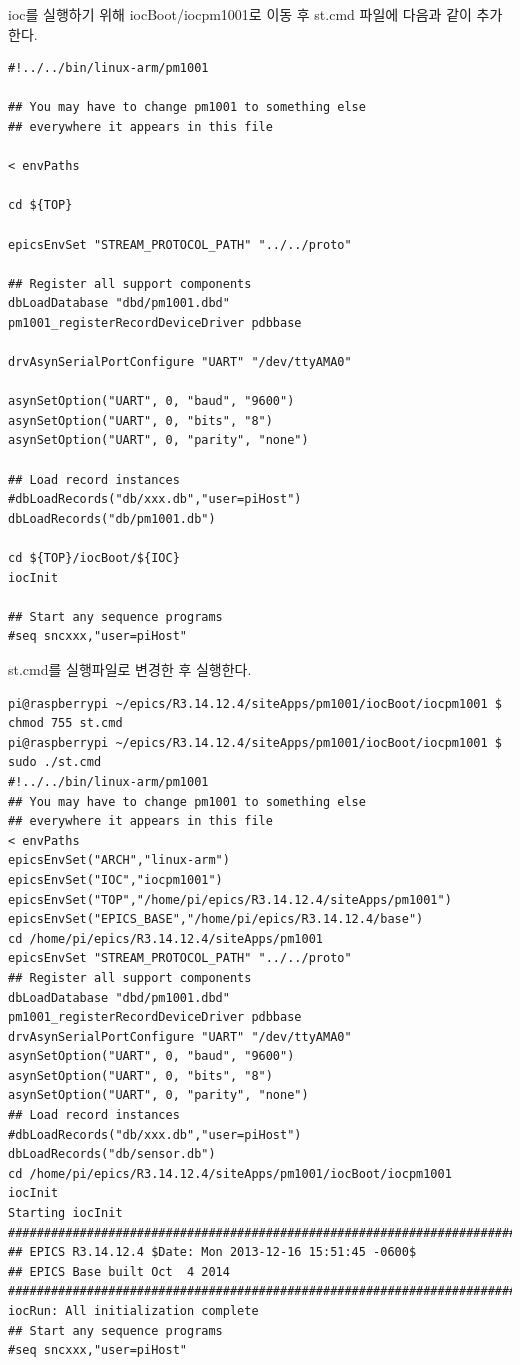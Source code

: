\documentclass[11pt
  , a4paper
  , article
  , oneside
]{memoir}
\begin{document}
ioc를 실행하기 위해 iocBoot/iocpm1001로 이동 후 st.cmd 파일에 다음과 같이 추가 한다.
\begin{lstlisting}[style=termstyle]
#!../../bin/linux-arm/pm1001

## You may have to change pm1001 to something else
## everywhere it appears in this file

< envPaths

cd ${TOP}

epicsEnvSet "STREAM_PROTOCOL_PATH" "../../proto"

## Register all support components
dbLoadDatabase "dbd/pm1001.dbd"
pm1001_registerRecordDeviceDriver pdbbase

drvAsynSerialPortConfigure "UART" "/dev/ttyAMA0"

asynSetOption("UART", 0, "baud", "9600")
asynSetOption("UART", 0, "bits", "8")
asynSetOption("UART", 0, "parity", "none")

## Load record instances
#dbLoadRecords("db/xxx.db","user=piHost")
dbLoadRecords("db/pm1001.db")

cd ${TOP}/iocBoot/${IOC}
iocInit

## Start any sequence programs
#seq sncxxx,"user=piHost"
\end{lstlisting}
st.cmd를 실행파일로 변경한 후 실행한다.
\begin{lstlisting}[style=termstyle]
pi@raspberrypi ~/epics/R3.14.12.4/siteApps/pm1001/iocBoot/iocpm1001 $ chmod 755 st.cmd
pi@raspberrypi ~/epics/R3.14.12.4/siteApps/pm1001/iocBoot/iocpm1001 $ sudo ./st.cmd
#!../../bin/linux-arm/pm1001
## You may have to change pm1001 to something else
## everywhere it appears in this file
< envPaths
epicsEnvSet("ARCH","linux-arm")
epicsEnvSet("IOC","iocpm1001")
epicsEnvSet("TOP","/home/pi/epics/R3.14.12.4/siteApps/pm1001")
epicsEnvSet("EPICS_BASE","/home/pi/epics/R3.14.12.4/base")
cd /home/pi/epics/R3.14.12.4/siteApps/pm1001
epicsEnvSet "STREAM_PROTOCOL_PATH" "../../proto"
## Register all support components
dbLoadDatabase "dbd/pm1001.dbd"
pm1001_registerRecordDeviceDriver pdbbase
drvAsynSerialPortConfigure "UART" "/dev/ttyAMA0"
asynSetOption("UART", 0, "baud", "9600")
asynSetOption("UART", 0, "bits", "8")
asynSetOption("UART", 0, "parity", "none")
## Load record instances
#dbLoadRecords("db/xxx.db","user=piHost")
dbLoadRecords("db/sensor.db")
cd /home/pi/epics/R3.14.12.4/siteApps/pm1001/iocBoot/iocpm1001
iocInit
Starting iocInit
############################################################################
## EPICS R3.14.12.4 $Date: Mon 2013-12-16 15:51:45 -0600$
## EPICS Base built Oct  4 2014
############################################################################
iocRun: All initialization complete
## Start any sequence programs
#seq sncxxx,"user=piHost"
\end{lstlisting}
\end{document}
